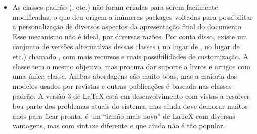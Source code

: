 \begin{itemize}
    \item As classes padrão (,  etc.) não foram criadas
    para serem facilmente modificadas, o que deu origem a inúmeras packages
    voltadas para possibilitar a personalização de diversos aspectos da
    apresentação final do documento. Esse mecanismo não é ideal, por diversas
    razões. Por conta disso, existe um conjunto de versões alternativas dessas
    classes ( no lugar de ,  no lugar de
     etc.) chamado , com mais recursos e mais
    possibilidades de customização. A classe  tem o mesmo objetivo,
    mas procura dar suporte a livros e artigos com uma única classe. Ambas
    abordagens são muito boas, mas a maioria dos modelos usados por revistas e
    outras publicações é baseada nas classes padrão. A versão 3 de \LaTeX{}
    está em desenvolvimento com vistas a resolver boa parte dos problemas
    atuais do sistema, mas ainda deve demorar muitos anos para ficar pronta.
    \ConTeXt{} é um ``irmão mais novo'' de \LaTeX{} com diversas
    vantagens, mas com sintaxe diferente e que ainda não é tão popular.
\end{itemize}
